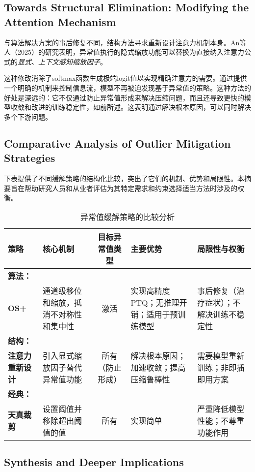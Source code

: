 \documentclass{article}
\begin{document}
\subsection{Towards Structural Elimination: Modifying the Attention Mechanism}

与算法解决方案的事后修复不同，结构方法寻求重新设计注意力机制本身。An等人（2025）的研究表明，异常值执行的隐式缩放功能可以替换为直接纳入注意力公式的\emph{显式、上下文感知缩放因子}。

这种修改消除了softmax函数生成极端logit值以实现精确注意力的需要。通过提供一个明确的机制来控制信息流，模型不再被迫发现基于异常值的策略。这种方法的好处是深远的：它不仅通过防止异常值形成来解决压缩问题，而且还导致更快的模型收敛和改进的训练稳定性，如前所述。这表明通过解决根本原因，可以同时解决多个下游问题。

\subsection{Comparative Analysis of Outlier Mitigation Strategies}

下表提供了不同缓解策略的结构化比较，突出了它们的机制、优势和局限性。本摘要旨在帮助研究人员和从业者评估为其特定需求和约束选择适当方法时涉及的权衡。

\begin{table}
  \caption{异常值缓解策略的比较分析}
  \label{mitigation-strategies}
  \centering
  \small
  \begin{tabular}{l p{3.5cm} c p{3cm} p{3cm}}
    \toprule
    策略 & 核心机制 & 目标异常值类型 & 主要优势 & 局限性与权衡 \\
    \midrule
    \textbf{算法：}\\\textbf{OS+} & 通道级移位和缩放，抵消不对称性和集中性 & 激活 & 实现高精度PTQ；无推理开销；适用于预训练模型 & 事后修复（治疗症状）；不解决训练不稳定性 \\
    \textbf{结构：}\\\textbf{注意力重新设计} & 引入显式缩放因子替代异常值功能 & 所有（防止形成） & 解决根本原因；加速收敛；提高压缩鲁棒性 & 需要模型重新训练；非即插即用方案 \\
    \textbf{经典：}\\\textbf{天真裁剪} & 设置阈值并移除超出阈值的值 & 所有 & 实现简单 & 严重降低模型性能；不尊重功能作用 \\
    \bottomrule
  \end{tabular}
\end{table}

\subsection{Synthesis and Deeper Implications}
\end{document}
